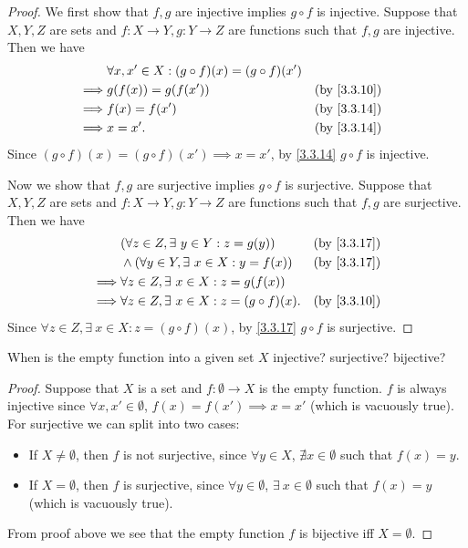 \begin{proof}
  We first show that \(f, g\) are injective implies \(g \circ f\) is injective.
  Suppose that \(X, Y, Z\) are sets and \(f : X \to Y, g : Y \to Z\) are functions such that \(f, g\) are injective.
  Then we have
  \begin{align*}
             & \forall x, x' \in X : (g \circ f)(x) = (g \circ f)(x')                                \\
    \implies & g(f(x)) = g(f(x'))                                     &  & \text{(by \cref{3.3.10})} \\
    \implies & f(x) = f(x')                                           &  & \text{(by \cref{3.3.14})} \\
    \implies & x = x'.                                                &  & \text{(by \cref{3.3.14})}
  \end{align*}
  Since \((g \circ f)(x) = (g \circ f)(x') \implies x = x'\), by \cref{3.3.14} \(g \circ f\) is injective.

  Now we show that \(f, g\) are surjective implies \(g \circ f\) is surjective.
  Suppose that \(X, Y, Z\) are sets and \(f : X \to Y, g : Y \to Z\) are functions such that \(f, g\) are surjective.
  Then we have
  \begin{align*}
             & (\forall z \in Z, \exists\ y \in Y : z = g(y))          &  & \text{(by \cref{3.3.17})} \\
             & \land (\forall y \in Y, \exists\ x \in X : y = f(x))    &  & \text{(by \cref{3.3.17})} \\
    \implies & \forall z \in Z, \exists\ x \in X : z = g(f(x))                                        \\
    \implies & \forall z \in Z, \exists\ x \in X : z = (g \circ f)(x). &  & \text{(by \cref{3.3.10})}
  \end{align*}
  Since \(\forall z \in Z, \exists\ x \in X : z = (g \circ f)(x)\), by \cref{3.3.17} \(g \circ f\) is surjective.
\end{proof}

\begin{ex}\label{ex:3.3.3}
  When is the empty function into a given set \(X\) injective?
  surjective?
  bijective?
\end{ex}

\begin{proof}
  Suppose that \(X\) is a set and \(f : \emptyset \to X\) is the empty function.
  \(f\) is always injective since \(\forall x, x' \in \emptyset\), \(f(x) = f(x') \implies x = x'\) (which is vacuously true).
  For surjective we can split into two cases:
  \begin{itemize}
    \item If \(X \neq \emptyset\), then \(f\) is not surjective, since \(\forall y \in X\), \(\nexists x \in \emptyset\) such that \(f(x) = y\).
    \item If \(X = \emptyset\), then \(f\) is surjective, since \(\forall y \in \emptyset\), \(\exists\ x \in \emptyset\) such that \(f(x) = y\) (which is vacuously true).
  \end{itemize}
  From proof above we see that the empty function \(f\) is bijective iff \(X = \emptyset\).
\end{proof}

